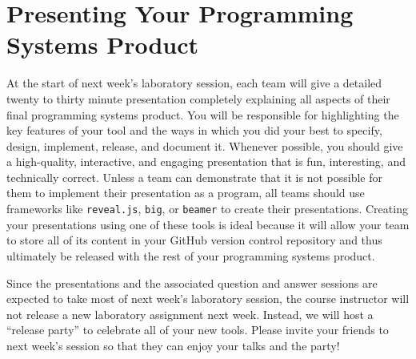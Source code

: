 \section*{Presenting Your Programming Systems Product}

At the start of next week's laboratory session, each team will give a detailed twenty to thirty minute presentation
completely explaining all aspects of their final programming systems product. You will be responsible for highlighting
the key features of your tool and the ways in which you did your best to specify, design, implement, release, and
document it.  Whenever possible, you should give a high-quality, interactive, and engaging presentation that is fun,
interesting, and technically correct. Unless a team can demonstrate that it is not possible for them to implement their
presentation as a program, all teams should use frameworks like {\tt reveal.js}, {\tt big}, or {\tt beamer} to create
their presentations. Creating your presentations using one of these tools is ideal because it will allow your team to
store all of its content in your GitHub version control repository and thus ultimately be released with the rest of your
programming systems product.

Since the presentations and the associated question and answer sessions are expected to take most of next week's
laboratory session, the course instructor will not release a new laboratory assignment next week. Instead, we will host
a ``release party'' to celebrate all of your new tools. Please invite your friends to next week's session so that they
can enjoy your talks and the party!




